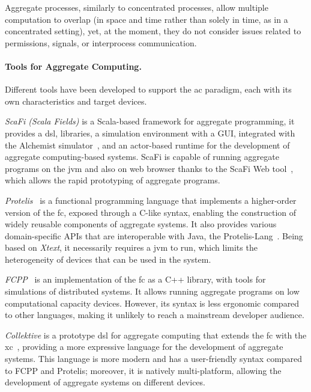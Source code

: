 \documentclass[12pt, a4paper]{article}
\begin{document}
Aggregate processes, similarly to concentrated processes,
allow multiple computation to overlap
(in space and time rather than solely in time, as in a concentrated setting),
yet, at the moment,
they do not consider issues related to permissions, signals, or interprocess communication.


\sloppypar
\paragraph{Tools for Aggregate Computing.}

Different tools have been developed to support the \ac{ac} paradigm,
each with its own characteristics and target devices.

\emph{ScaFi (Scala Fields)}\cite{scafi} is a Scala-based framework for aggregate programming,
it provides a \ac{dsl}, libraries, a simulation environment with a GUI,
integrated with the Alchemist simulator~\cite{PianiniJOS2013},
and an actor-based runtime for the development of aggregate computing-based systems.
%
ScaFi is capable of running aggregate programs on the \ac{jvm} and also on web browser thanks to the ScaFi Web tool~\cite{Coordination2021-scafiweb},
which allows the rapid prototyping of aggregate programs.

\emph{Protelis}~\cite{PianiniSAC2015} is a functional programming language that implements a higher-order version of the \ac{fc},
exposed through a C-like syntax,
enabling the construction of widely reusable components of aggregate systems.
%
It also provides various domain-specific APIs that are interoperable with Java, the Protelis-Lang~\cite{SASO2017-protelislang}.
%
Being based on \emph{Xtext},
it necessarily requires a \ac{jvm} to run,
which limits the heterogeneity of devices that can be used in the system.

\emph{FCPP}~\cite{DBLP:journals/scp/AudritoT24} is an implementation of the \ac{fc} as a C++ library,
with tools for simulations of distributed systems.
%
It allows running aggregate programs on low computational capacity devices.
%
However,
its syntax is less ergonomic compared to other languages,
making it unlikely to reach a mainstream developer audience.

\emph{Collektive} is a prototype \ac{dsl} for aggregate computing that extends the \ac{fc} with the \ac{xc}~\cite{AudritoCDSV24},
providing a more expressive language for the development of aggregate systems.
%
This language is more modern and has a user-friendly syntax compared to FCPP and Protelis;
moreover, it is natively multi-platform,
allowing the development of aggregate systems on different devices.
\end{document}
